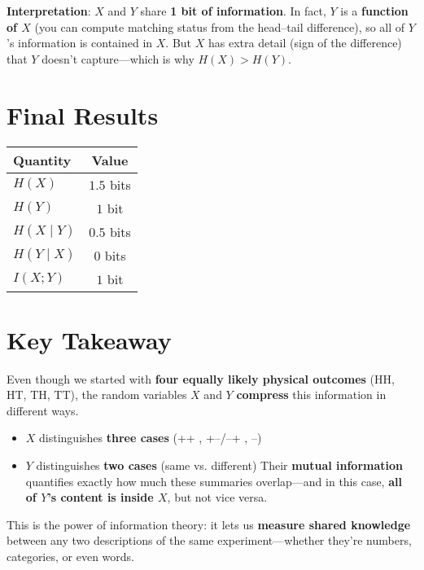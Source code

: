 \documentclass[11pt]{article}
\begin{document}
\textbf{Interpretation}: $X$ and $Y$ share \textbf{1 bit of information}.  
In fact, $Y$ is a \textbf{function of $X$} (you can compute matching status from the head--tail difference), so all of $Y$'s information is contained in $X$. But $X$ has extra detail (sign of the difference) that $Y$ doesn't capture—which is why $H(X) > H(Y)$.

\section*{{Final Results}}

\begin{center}
\begin{tabular}{lc}
\toprule
Quantity & Value \\
\midrule
$H(X)$ & $1.5$ bits \\
$H(Y)$ & $1$ bit \\
$H(X \mid Y)$ & $0.5$ bits \\
$H(Y \mid X)$ & $0$ bits \\
$I(X; Y)$ & $1$ bit \\
\bottomrule
\end{tabular}
\end{center}

\section*{{Key Takeaway}}

Even though we started with \textbf{four equally likely physical outcomes} (HH, HT, TH, TT), the random variables $X$ and $Y$ \textbf{compress} this information in different ways.
 \begin{itemize}
    \item $X$ distinguishes \textbf{three cases} (++ , +--/--+ , --)
    \item $Y$ distinguishes \textbf{two cases} (same vs. different)
Their \textbf{mutual information} quantifies exactly how much these summaries overlap—and in this case, \textbf{all of $Y$'s content is inside $X$}, but not vice versa.
\end{itemize}

This is the power of information theory: it lets us \textbf{measure shared knowledge} between any two descriptions of the same experiment—whether they’re numbers, categories, or even words.

\newpage
\end{document}
